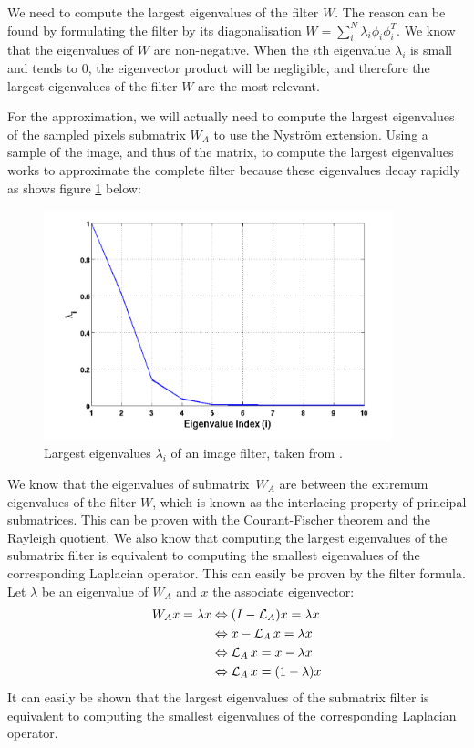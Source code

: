 We need to compute the largest eigenvalues of the filter \(W\).
\ifthesis
 The reason can be found by formulating the filter by its diagonalisation \(W = \sum_i^N \lambda_i \phi_i \phi_i^T\).
 We know that the eigenvalues of \(W\) are non-negative.
 When the \(i\)th eigenvalue \(\lambda_i\) is small and tends to 0, the eigenvector product will be negligible, and therefore the largest eigenvalues of the filter \(W\) are the most relevant.

 For the approximation, we will actually need to compute the largest eigenvalues of the sampled pixels submatrix \(W_A\) to use the Nystr\"om extension.
 Using a sample of the image, and thus of the matrix, to compute the largest eigenvalues works to approximate the complete filter because these eigenvalues decay rapidly as shows figure \ref{fig:eigenvalues} below:
 \begin{figure}[H]
   \centering
   \includegraphics[width=0.9\textwidth]{img/decayingEigenvalues.png}
   \caption{Largest eigenvalues \(\lambda_i\) of an image filter, taken from \cite{siam_slides_2016}.}
   \label{fig:eigenvalues}
 \end{figure}
\fi

\ifthesis
 We know that the eigenvalues of submatrix\ \(W_A\) are between the extremum eigenvalues of the filter \(W\), which is known as the interlacing property of principal submatrices.
 This can be proven with the Courant-Fischer theorem and the Rayleigh quotient.
 We also know that computing the largest eigenvalues of the submatrix filter is equivalent to computing the smallest eigenvalues of the corresponding Laplacian operator.
 This can easily be proven by the filter formula.
 Let \(\lambda\) be an eigenvalue of \(W_A\) and \(x\) the associate eigenvector:
 \begin{equation}
  \begin{split}
      W_A x = \lambda x & \Leftrightarrow (I - \operatorname{\mathcal{L}}_A)x = \lambda x \\
                      & \Leftrightarrow x - \operatorname{\mathcal{L}}_A x = \lambda x \\
                      & \Leftrightarrow \operatorname{\mathcal{L}}_A x = x - \lambda x \\
                      & \Leftrightarrow \operatorname{\mathcal{L}}_A x = (1 - \lambda) x
  \end{split}
 \end{equation}
\else
 It can easily be shown that the largest eigenvalues of the submatrix filter is equivalent to computing the smallest eigenvalues of the corresponding Laplacian operator.
\fi

